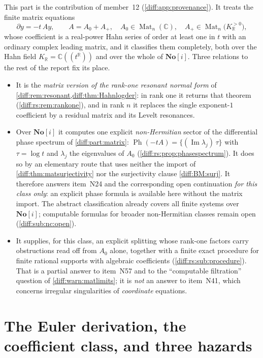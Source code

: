 \documentclass[11pt,letterpaper]{article}
\numberwithin{equation}{section}
\theoremstyle{definition}
\theoremstyle{remark}
\newcommand{\SC}{\mathbf{No}[i]}
\newcommand{\R}{\mathbb R}
\newcommand{\C}{\mathbb C}
\newcommand{\der}{\partial}
\newcommand{\Imm}{\operatorname{Im}}
\newcommand{\Mat}{\operatorname{Mat}}
\newcommand{\Ph}{\operatorname{Ph}}
\newcommand{\KR}{K_{\R}}
\begin{document}
This part is the contribution of member~12 (\cref{diff:app:provenance}). It
treats the finite matrix equations
\[
 \der y=-t\,Ay,\qquad A=A_{0}+A_{+},\quad A_{0}\in\Mat_{n}(\C),\quad
 A_{+}\in\Mat_{n}\bigl(\KR^{>0}\bigr),
\]
whose coefficient is a real-power Hahn series of order at least one in $t$ with
an ordinary complex leading matrix, and it classifies them completely, both
over the Hahn field $\KR=\C((t^{\R}))$ and over the whole of $\SC$. Three
relations to the rest of the report fix its place.
\begin{itemize}[leftmargin=1.6em]
\item It is the \emph{matrix version of the rank-one resonant normal form}
of \cref{diff:rem:resonant,diff:thm:Hahnlogder}: in rank one it returns that
theorem (\cref{diff:rs:rem:rankone}), and in rank $n$ it replaces the single
exponent-$1$ coefficient by a residual matrix and its Levelt resonances.
\item Over $\SC$ it computes one explicit \emph{non-Hermitian} sector of the
differential phase spectrum of \cref{diff:part:matrix}:
$\Ph(-tA)=\{(\Imm\lambda_{j})\,\tau\}$ with $\tau=\log t$ and $\lambda_{j}$ the
eigenvalues of $A_{0}$ (\cref{diff:rs:prop:phasespectrum}). It does so by an
elementary route that uses neither the import of
\cref{diff:thm:matsurjectivity} nor the surjectivity clause
\ref{diff:BM:surj}. It therefore answers item~N24 and the corresponding open
continuation \emph{for this class only}: an explicit phase formula is available
here without the matrix import. The abstract classification already covers all
finite systems over $\SC$; computable formulas for broader non-Hermitian
classes remain open (\cref{diff:sub:nc:open}).
\item It supplies, for this class, an explicit splitting whose rank-one factors
carry obstructions read off from $A_{0}$ alone, together with a finite exact
procedure for finite rational supports with algebraic coefficients
(\cref{diff:rs:sub:procedure}). That is
a partial answer to item~N57 and to the ``computable filtration'' question of
\cref{diff:warn:matlimits}; it is \emph{not} an answer to item~N41, which
concerns irregular singularities of \emph{coordinate} equations.
\end{itemize}

\section{The Euler derivation, the coefficient class, and three hazards}
\label{diff:rs:sec:setting}
\end{document}
